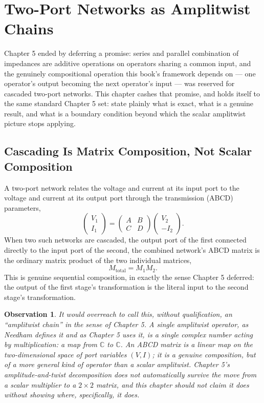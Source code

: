 \documentclass[12pt]{article}
\newtheorem{observation}{Observation}
\begin{document}
\section{Two-Port Networks as Amplitwist Chains}

Chapter 5 ended by deferring a promise: series and parallel combination of impedances are additive operations on operators sharing a common input, and the genuinely compositional operation this book's framework depends on — one operator's output becoming the next operator's input — was reserved for cascaded two-port networks. This chapter cashes that promise, and holds itself to the same standard Chapter 5 set: state plainly what is exact, what is a genuine result, and what is a boundary condition beyond which the scalar amplitwist picture stops applying.

\subsection{Cascading Is Matrix Composition, Not Scalar Composition}

A two-port network relates the voltage and current at its input port to the voltage and current at its output port through the transmission (ABCD) parameters,
\[
\begin{pmatrix} V_1 \\ I_1 \end{pmatrix} = \begin{pmatrix} A & B \\ C & D \end{pmatrix} \begin{pmatrix} V_2 \\ -I_2 \end{pmatrix}.
\]
When two such networks are cascaded, the output port of the first connected directly to the input port of the second, the combined network's ABCD matrix is the ordinary matrix product of the two individual matrices,
\[
M_{\text{total}} = M_1 M_2.
\]
This is genuine sequential composition, in exactly the sense Chapter 5 deferred: the output of the first stage's transformation is the literal input to the second stage's transformation.

\begin{observation}
It would overreach to call this, without qualification, an ``amplitwist chain'' in the sense of Chapter 5. A single amplitwist operator, as Needham defines it and as Chapter 5 uses it, is a single complex number acting by multiplication: a map from $\mathbb{C}$ to $\mathbb{C}$. An ABCD matrix is a linear map on the two-dimensional space of port variables $(V, I)$; it is a genuine composition, but of a more general kind of operator than a scalar amplitwist. Chapter 5's amplitude-and-twist decomposition does not automatically survive the move from a scalar multiplier to a $2\times2$ matrix, and this chapter should not claim it does without showing where, specifically, it does.
\end{observation}
\end{document}
